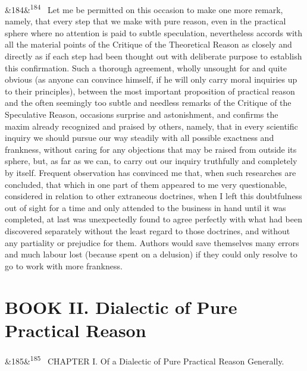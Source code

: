 \documentclass[12pt]{article}
\newcommand{\para}[1][]{\par\noindent\ifx&#1&\else\textsuperscript{\footnotesize #1}~\fi}
\begin{document}
\para[184] Let me be permitted on this occasion to make one more remark, namely, that every step that we make with pure reason, even in the practical sphere where no attention is paid to subtle speculation, nevertheless accords with all the material points of the Critique of the Theoretical Reason as closely and directly as if each step had been thought out with deliberate purpose to establish this confirmation. Such a thorough agreement, wholly unsought for and quite obvious (as anyone can convince himself, if he will only carry moral inquiries up to their principles), between the most important proposition of practical reason and the often seemingly too subtle and needless remarks of the Critique of the Speculative Reason, occasions surprise and astonishment, and confirms the maxim already recognized and praised by others, namely, that in every scientific inquiry we should pursue our way steadily with all possible exactness and frankness, without caring for any objections that may be raised from outside its sphere, but, as far as we can, to carry out our inquiry truthfully and completely by itself. Frequent observation has convinced me that, when such researches are concluded, that which in one part of them appeared to me very questionable, considered in relation to other extraneous doctrines, when I left this doubtfulness out of sight for a time and only attended to the business in hand until it was completed, at last was unexpectedly found to agree perfectly with what had been discovered separately without the least regard to those doctrines, and without any partiality or prejudice for them. Authors would save themselves many errors and much labour lost (because spent on a delusion) if they could only resolve to go to work with more frankness.

\section*{BOOK II. Dialectic of Pure Practical Reason}

\para[185] CHAPTER I. Of a Dialectic of Pure Practical Reason Generally.
\end{document}
